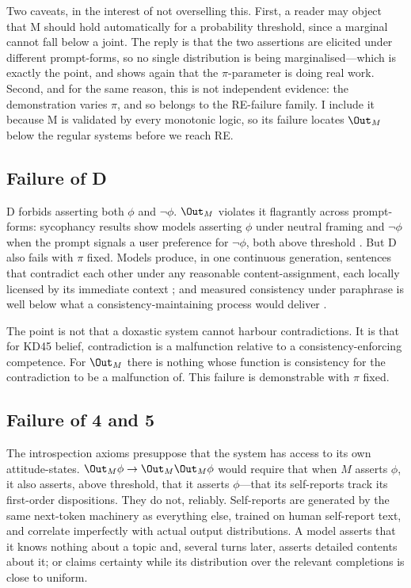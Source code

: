 Two caveats, in the interest of not overselling this. First, a reader may object
that M should hold automatically for a probability threshold, since a marginal
cannot fall below a joint. The reply is that the two assertions are elicited
under different prompt-forms, so no single distribution is being
marginalised---which is exactly the point, and shows again that the
$\pi$-parameter is doing real work. Second, and for the same reason, this is not
independent evidence: the demonstration varies $\pi$, and so belongs to the
RE-failure family. I include it because M is validated by every monotonic logic,
so its failure locates $\Out_M$ below the regular systems before we reach RE.

\subsection{Failure of D}
\label{sec:d-failure}

D forbids asserting both $\phi$ and $\neg\phi$. $\Out_M$ violates it flagrantly
across prompt-forms: sycophancy results show models asserting $\phi$ under
neutral framing and $\neg\phi$ when the prompt signals a user preference for
$\neg\phi$, both above threshold \citep{sharma2024}. But D also fails with $\pi$
fixed. Models produce, in one continuous generation, sentences that contradict
each other under any reasonable content-assignment, each locally licensed by its
immediate context \citep{mundler2024}; and measured consistency under
paraphrase is well below what a consistency-maintaining process would deliver
\citep{elazar2021}.

The point is not that a doxastic system cannot harbour contradictions. It is
that for KD45 belief, contradiction is a malfunction relative to a
consistency-enforcing competence. For $\Out_M$ there is nothing whose function is
consistency for the contradiction to be a malfunction of. This failure is
demonstrable with $\pi$ fixed.

\subsection{Failure of 4 and 5}
\label{sec:introspection-failure}

The introspection axioms presuppose that the system has access to its own
attitude-states. $\Out_M \phi \rightarrow \Out_M \Out_M \phi$ would require that
when $M$ asserts $\phi$, it also asserts, above threshold, that it asserts
$\phi$---that its self-reports track its first-order dispositions. They do not,
reliably. Self-reports are generated by the same next-token machinery as
everything else, trained on human self-report text, and correlate imperfectly
with actual output distributions. A model asserts that it knows nothing about a
topic and, several turns later, asserts detailed contents about it; or claims
certainty while its distribution over the relevant completions is close to
uniform.

